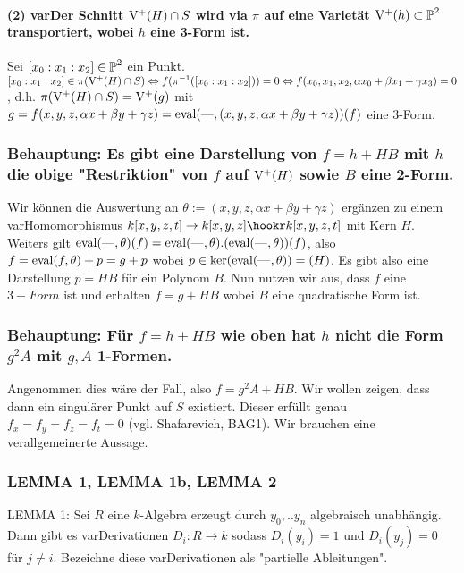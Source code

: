 \paragraph{(2) var{Der} Schnitt $\operatorname{V^+}(H) \cap S$ wird via $\pi$ auf eine Varietät $\operatorname{V^+}(h) \subset \operatorname{\mathbb P}^2$ transportiert, wobei $h$ eine 3-Form ist.}

Sei $[x_0:x_1:x_2] \in \operatorname{\mathbb P}^2$ ein Punkt.
$[x_0:x_1:x_2] \in \pi(\operatorname{V^+}(H)\cap S)
\Leftrightarrow f(\pi^{-1}([x_0:x_1:x_2])) = 0
\Leftrightarrow f(x_0,x_1,x_2,\alpha x_0 + \beta x_1 + \gamma x_3) = 0$, d.h. $\pi(\operatorname{V^+}(H)\cap S) = \operatorname{V^+}(g)$ mit $g=f(x, y, z, \alpha x + \beta y + \gamma z) = {\operatorname{eval}}({\operatorname{---}},(x, y, z, \alpha x + \beta y + \gamma z))(f)$ eine 3-Form.

\subsubsection{%
Behauptung: Es gibt eine Darstellung von $f = h + HB$ mit $h$ die obige "Restriktion" von $f$ auf $\operatorname{V^+}(H)$ sowie $B$ eine 2-Form.
} %


Wir können die Auswertung an $\theta := (x,y,z,\alpha x + \beta y + \gamma z)$ ergänzen zu einem var{Hom}omorphismus $k[x,y,z,t] \to k[x,y,z] \hookr k[x,y,z,t]$ mit Kern $H$. Weiters gilt ${\operatorname{eval}}({\operatorname{---}},\theta)(f) = {\operatorname{eval}}({\operatorname{---}},\theta).({\operatorname{eval}}({\operatorname{---}},\theta))(f)$, also $f = {\operatorname{eval}}(f,\theta) + p = g+p$ wobei $p \in \ker({\operatorname{eval}}({\operatorname{---}},\theta)) = (H)$.
Es gibt also eine Darstellung $p = HB$ für ein Polynom $B$.
Nun nutzen wir aus, dass $f$ eine $3-Form$ ist und erhalten $f = g+HB$ wobei $B$ eine quadratische Form ist.

\subsubsection{%
Behauptung: Für $f = h + HB$ wie oben hat $h$ nicht die Form $g^2A$ mit $g,A$ 1-Formen.
} %

Angenommen dies wäre der Fall, also $f = g^2A+HB$.
Wir wollen zeigen, dass dann ein singulärer Punkt auf $S$ existiert.
Dieser erfüllt genau $f_x = f_y = f_z = f_t = 0$ (vgl. Shafarevich, BAG1).
Wir brauchen eine verallgemeinerte Aussage.



\subsubsection{LEMMA 1, LEMMA 1b, LEMMA 2}%
LEMMA 1: Sei $R$ eine $k$-Algebra erzeugt durch $y_0,..y_n$ algebraisch unabhängig.
Dann gibt es var{Der}ivationen $D_i : R \to k$ sodass $D_i(y_i) = 1$ und $D_i(y_j) = 0$ für $j\neq i$. Bezeichne diese var{Der}ivationen als "partielle Ableitungen".

